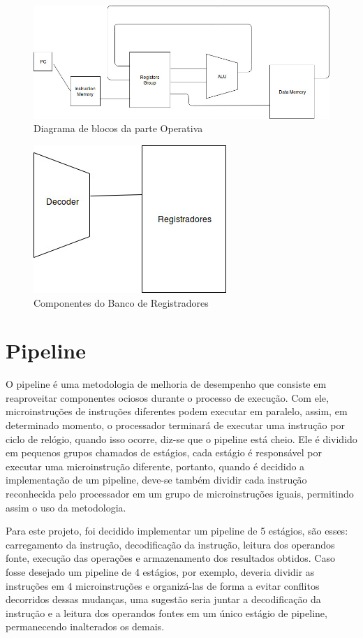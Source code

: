 \documentclass[12pt]{article}
\begin{document}
\begin{figure}[!ht]
\centering
\includegraphics[width=.9\textwidth]{img/op1.jpeg}
\caption{Diagrama de blocos da parte Operativa}
\label{fig:blocosOperativa}
\end{figure}

\begin{figure}[!ht]
\centering
\includegraphics[width=.4\textwidth]{img/op2.jpeg}
\caption{Componentes do Banco de Registradores}
\label{fig:blocosOp2}
\end{figure}

\section{Pipeline}
O pipeline é uma metodologia de melhoria de desempenho que consiste em reaproveitar componentes ociosos durante o processo de execução. Com ele, microinstruções de instruções diferentes podem executar em paralelo, assim, em determinado momento, o processador terminará de executar uma instrução por ciclo de relógio, quando isso ocorre, diz-se que o pipeline está cheio. Ele é dividido em pequenos grupos chamados de estágios, cada estágio é responsável por executar uma microinstrução diferente, portanto, quando é decidido a implementação de um pipeline, deve-se também dividir cada instrução reconhecida pelo processador em um grupo de microinstruções iguais, permitindo assim o uso da metodologia.

    Para este projeto, foi decidido implementar um pipeline de 5 estágios, são esses: carregamento da instrução, decodificação da instrução, leitura dos operandos fonte, execução das operações e armazenamento dos resultados obtidos. Caso fosse desejado um pipeline de 4 estágios, por exemplo, deveria dividir as instruções em 4 microinstruções e organizá-las de forma a evitar conflitos decorridos dessas mudanças, uma sugestão seria juntar a decodificação da instrução e a leitura dos operandos fontes em um único estágio de pipeline, permanecendo inalterados os demais. 
\end{document}
